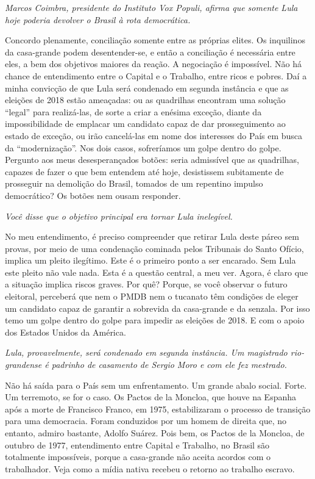 \itshape
Marcos Coimbra, presidente do Instituto Vox Populi,
afirma que somente Lula hoje poderia devolver o Brasil à rota
democrática.

\normalfont 
Concordo plenamente, conciliação somente entre as
próprias elites. Os inquilinos da casa-grande podem desentender-se, e
então a conciliação é necessária entre eles, a bem dos objetivos maiores
da reação. A negociação é impossível. Não há chance de entendimento
entre o Capital e o Trabalho, entre ricos e pobres. Daí a minha
convicção de que Lula será condenado em segunda instância e que as
eleições de 2018 estão ameaçadas: ou as quadrilhas encontram uma solução
``legal'' para realizá-las, de sorte a criar a enésima exceção, diante
da impossibilidade de emplacar um candidato capaz de dar prosseguimento
ao estado de exceção, ou irão cancelá-las em nome dos interesses do País
em busca da ``modernização''. Nos dois casos, sofreríamos um golpe
dentro do golpe. Pergunto aos meus desesperançados botões: seria
admissível que as quadrilhas, capazes de fazer o que bem entendem até
hoje, desistissem subitamente de prosseguir na demolição do Brasil,
tomados de um repentino impulso democrático? Os botões nem ousam
responder.

\itshape
Você disse que o objetivo principal era tornar Lula
inelegível.

\normalfont 
No meu entendimento, é preciso compreender que retirar
Lula deste páreo sem provas, por meio de uma condenação cominada pelos
Tribunais do Santo Ofício, implica um pleito ilegítimo. Este é o
primeiro ponto a ser encarado. Sem Lula este pleito não vale nada. Esta
é a questão central, a meu ver. Agora, é claro que a situação implica
riscos graves. Por quê? Porque, se você observar o futuro eleitoral,
perceberá que nem o PMDB nem o tucanato têm condições de eleger um
candidato capaz de garantir a sobrevida da casa-grande e da senzala. Por
isso temo um golpe dentro do golpe para impedir as eleições de 2018. E
com o apoio dos Estados Unidos da América.

\itshape
Lula, provavelmente, será condenado em segunda
instância. Um magistrado rio-grandense é padrinho de casamento de Sergio
Moro e com ele fez mestrado.

\normalfont 
Não há saída para o País sem um enfrentamento. Um grande
abalo social. Forte. Um terremoto, se for o caso. Os Pactos de la
Moncloa, que houve na Espanha após a morte de Francisco Franco, em 1975,
estabilizaram o processo de transição para uma democracia. Foram
conduzidos por um homem de direita que, no entanto, admiro bastante,
Adolfo Suárez. Pois bem, os Pactos de la Moncloa, de outubro de 1977,
entendimento entre Capital e Trabalho, no Brasil são totalmente
impossíveis, porque a casa-grande não aceita acordos com o trabalhador.
Veja como a mídia nativa recebeu o retorno ao trabalho escravo.

